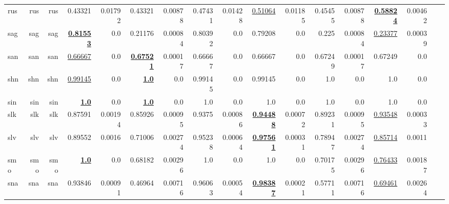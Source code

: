\documentclass[11pt]{article}
\begin{document}
\begin{table*}[h]
{\begin{tabular}{lrrrrrrrrrrrrrrrr}
rus         & rus         & rus         & 0.43321         & 0.01792         & 0.43321         & 0.00878         & 0.47431         & 0.01428         & \underline{0.51064}         & 0.01185         & 0.45455         & 0.00878         & \textbf{\underline{0.58824}}         & 0.00462         \\
sag         & sag         & sag         & \textbf{\underline{0.81553}}         & 0.0         & 0.21176         & 0.00084         & 0.80392         & 0.0         & 0.79208         & 0.0         & 0.225         & 0.00084         & \underline{0.23377}         & 0.00039         \\
san         & san         & san         & \underline{0.66667}         & 0.0         & \textbf{\underline{0.67521}}         & 0.00017         & 0.66667         & 0.0         & 0.66667         & 0.0         & 0.67249         & 0.00017         & 0.67249         & 0.0         \\
shn         & shn         & shn         & \underline{0.99145}         & 0.0         & \textbf{\underline{1.0}}         & 0.0         & 0.99145         & 0.0         & 0.99145         & 0.0         & 1.0         & 0.0         & 1.0         & 0.0         \\
sin         & sin         & sin         & \textbf{\underline{1.0}}         & 0.0         & \textbf{\underline{1.0}}         & 0.0         & 1.0         & 0.0         & 1.0         & 0.0         & 1.0         & 0.0         & 1.0         & 0.0         \\
slk         & slk         & slk         & 0.87591         & 0.00194         & 0.85926         & 0.00095         & 0.9375         & 0.00086         & \textbf{\underline{0.94488}}         & 0.00072         & 0.89231         & 0.00095         & \underline{0.93548}         & 0.00033         \\
slv         & slv         & slv         & 0.89552         & 0.0016         & 0.71006         & 0.00274         & 0.95238         & 0.00064         & \textbf{\underline{0.97561}}         & 0.00031         & 0.78947         & 0.00274         & \underline{0.85714}         & 0.0011         \\
smo         & smo         & smo         & \textbf{\underline{1.0}}         & 0.0         & 0.68182         & 0.00296         & 1.0         & 0.0         & 1.0         & 0.0         & 0.70175         & 0.00296         & \underline{0.76433}         & 0.00187         \\
sna         & sna         & sna         & 0.93846         & 0.00091         & 0.46964         & 0.00716         & 0.96063         & 0.00054         & \textbf{\underline{0.98387}}         & 0.00021         & 0.57711         & 0.00716         & \underline{0.69461}         & 0.00264         \\

\end{tabular}}
\end{table*}
\end{document}
